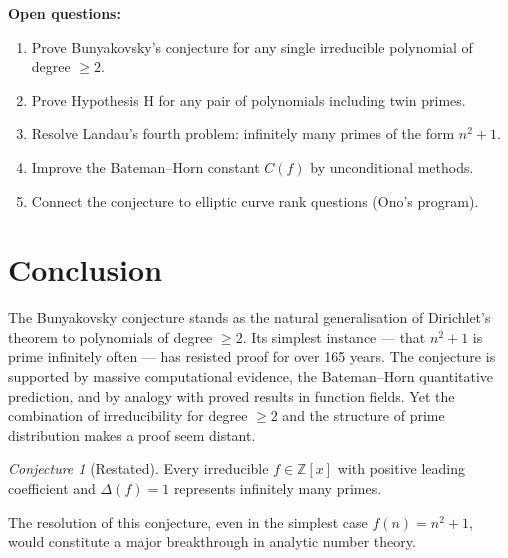 \documentclass[12pt,a4paper]{amsart}
\theoremstyle{definition}
\theoremstyle{remark}
\newtheorem{conjecture}[theorem]{Conjecture}
\newcommand{\Z}{\mathbb{Z}}
\begin{document}
\noindent\textbf{Open questions:}
\begin{enumerate}[label=(\arabic*)]
  \item Prove Bunyakovsky's conjecture for any single irreducible polynomial
        of degree $\geq 2$.
  \item Prove Hypothesis H for any pair of polynomials including twin primes.
  \item Resolve Landau's fourth problem: infinitely many primes of the form $n^2 + 1$.
  \item Improve the Bateman--Horn constant $C(f)$ by unconditional methods.
  \item Connect the conjecture to elliptic curve rank questions (Ono's program).
\end{enumerate}

\section{Conclusion}

The Bunyakovsky conjecture stands as the natural generalisation of Dirichlet's
theorem to polynomials of degree $\geq 2$.
Its simplest instance --- that $n^2 + 1$ is prime infinitely often --- has
resisted proof for over 165 years.
The conjecture is supported by massive computational evidence, the Bateman--Horn
quantitative prediction, and by analogy with proved results in function fields.
Yet the combination of irreducibility for degree $\geq 2$ and the structure of
prime distribution makes a proof seem distant.

\begin{conjecture}[Restated]
Every irreducible $f \in \Z[x]$ with positive leading coefficient and
$\Delta(f) = 1$ represents infinitely many primes.
\end{conjecture}

The resolution of this conjecture, even in the simplest case $f(n) = n^2 + 1$,
would constitute a major breakthrough in analytic number theory.
\end{document}
